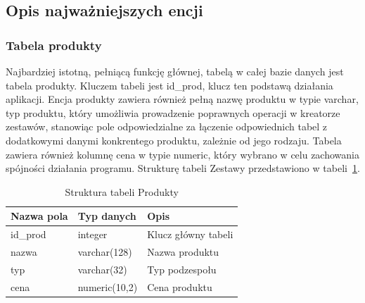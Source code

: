 \documentclass[a4paper,twoside,12pt]{book}
\begin{document}
\newpage 

\subsection{Opis najważniejszych encji}

\subsubsection{Tabela produkty}

Najbardziej istotną, pełniącą funkcję głównej, tabelą w całej bazie danych jest tabela produkty. Kluczem tabeli jest id\_prod, klucz ten podstawą działania aplikacji. Encja produkty zawiera również pełną nazwę produktu w typie varchar, typ produktu, który umożliwia prowadzenie poprawnych operacji w kreatorze zestawów, stanowiąc pole odpowiedzialne za łączenie odpowiednich tabel z dodatkowymi danymi konkrentego produktu, zależnie od jego rodzaju. Tabela zawiera również kolumnę cena w typie numeric, który wybrano w celu zachowania spójności działania programu. Strukturę tabeli Zestawy przedstawiono w tabeli~\ref{tab:produkty}.

\begin{table}[H]
\centering
\caption{Struktura tabeli Produkty}
\label{tab:produkty}
\begin{tabular}{lll}
\hline
Nazwa pola & Typ danych & Opis \\ \hline
id\_prod & integer & Klucz główny tabeli \\
nazwa & varchar(128) & Nazwa produktu \\
typ & varchar(32) & Typ podzespołu \\
cena & numeric(10,2) & Cena produktu \\ \hline
\end{tabular}
\end{table}
\end{document}
